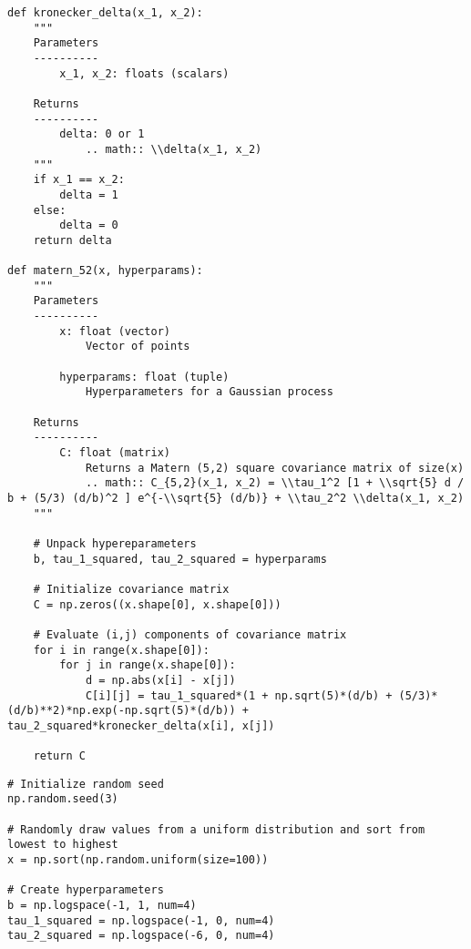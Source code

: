 \documentclass[10pt]{article}
\begin{document}
\begin{enumerate}[label=(\Alph*)]
        \begin{lstlisting}
def kronecker_delta(x_1, x_2):
    """
    Parameters
    ----------
        x_1, x_2: floats (scalars)
    
    Returns
    ----------
        delta: 0 or 1
            .. math:: \\delta(x_1, x_2)
    """
    if x_1 == x_2:
        delta = 1
    else:
        delta = 0
    return delta

def matern_52(x, hyperparams):
    """
    Parameters
    ----------
        x: float (vector)
            Vector of points

        hyperparams: float (tuple)
            Hyperparameters for a Gaussian process

    Returns
    ----------
        C: float (matrix)
            Returns a Matern (5,2) square covariance matrix of size(x)
            .. math:: C_{5,2}(x_1, x_2) = \\tau_1^2 [1 + \\sqrt{5} d / b + (5/3) (d/b)^2 ] e^{-\\sqrt{5} (d/b)} + \\tau_2^2 \\delta(x_1, x_2)
    """

    # Unpack hypereparameters
    b, tau_1_squared, tau_2_squared = hyperparams

    # Initialize covariance matrix
    C = np.zeros((x.shape[0], x.shape[0]))

    # Evaluate (i,j) components of covariance matrix
    for i in range(x.shape[0]):
        for j in range(x.shape[0]):
            d = np.abs(x[i] - x[j])
            C[i][j] = tau_1_squared*(1 + np.sqrt(5)*(d/b) + (5/3)*(d/b)**2)*np.exp(-np.sqrt(5)*(d/b)) + tau_2_squared*kronecker_delta(x[i], x[j])

    return C
        \end{lstlisting}

        \begin{lstlisting}
# Initialize random seed
np.random.seed(3)

# Randomly draw values from a uniform distribution and sort from lowest to highest
x = np.sort(np.random.uniform(size=100))

# Create hyperparameters
b = np.logspace(-1, 1, num=4)
tau_1_squared = np.logspace(-1, 0, num=4)
tau_2_squared = np.logspace(-6, 0, num=4)
        \end{lstlisting}


\end{enumerate}
\end{document}
